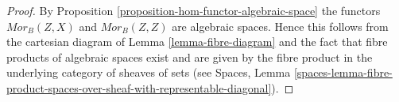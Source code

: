\documentclass{stacks-project}
\theoremstyle{plain}
\theoremstyle{definition}
\theoremstyle{remark}
\numberwithin{equation}{subsection}
\begin{document}
\begin{proof}
By
Proposition \ref{proposition-hom-functor-algebraic-space}
the functors $\mathit{Mor}_B(Z, X)$ and $\mathit{Mor}_B(Z, Z)$
are algebraic spaces. Hence this follows from the cartesian
diagram of
Lemma \ref{lemma-fibre-diagram}
and the fact that fibre products of algebraic spaces exist and
are given by the fibre product in the underlying category of
sheaves of sets (see
Spaces, Lemma
\ref{spaces-lemma-fibre-product-spaces-over-sheaf-with-representable-diagonal}).
\end{proof}
\end{document}

